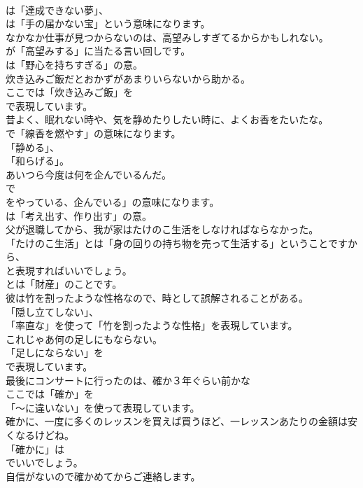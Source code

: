 \documentclass[8pt]{extreport}
\begin{document}
\begin{CJK}{UTF8}{min}
\\	は「達成できない夢」、
\\	は「手の届かない宝」という意味になります。	
\\	なかなか仕事が見つからないのは、高望みしすぎてるからかもしれない。 
\\	が「高望みする」に当たる言い回しです。
\\	は「野心を持ちすぎる」の意。	
\\	炊き込みご飯だとおかずがあまりいらないから助かる。 
\\	ここでは「炊き込みご飯」を 
\\	で表現しています。	
\\	昔よく、眠れない時や、気を静めたりしたい時に、よくお香をたいたな。 
\\	で「線香を燃やす」の意味になります。
\\	「静める」、
\\	「和らげる」。	
\\	あいつら今度は何を企んでいるんだ。 
\\	で
\\	をやっている、企んでいる」の意味になります。
\\	は「考え出す、作り出す」の意。	
\\	父が退職してから、我が家はたけのこ生活をしなければならなかった。 
\\	「たけのこ生活」とは「身の回りの持ち物を売って生活する」ということですから、
\\	と表現すればいいでしょう。
\\	とは「財産」のことです。	
\\	彼は竹を割ったような性格なので、時として誤解されることがある。 
\\	「隠し立てしない」、
\\	「率直な」を使って「竹を割ったような性格」を表現しています。	
\\	これじゃあ何の足しにもならない。 
\\	「足しにならない」を 
\\	で表現しています。	
\\	最後にコンサートに行ったのは、確か３年ぐらい前かな 
\\	ここでは「確か」を
\\	「～に違いない」を使って表現しています。	
\\	確かに、一度に多くのレッスンを買えば買うほど、一レッスンあたりの金額は安くなるけどね。 
\\	「確かに」は
\\	でいいでしょう。	
\\	自信がないので確かめてからご連絡します。 

\end{CJK}
\end{document}
